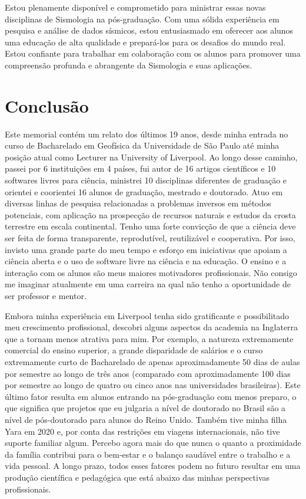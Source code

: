 \documentclass[10pt,a4paper,oneside]{book}
\begin{document}
Estou plenamente disponível e comprometido para ministrar essas novas disciplinas de Sismologia na pós-graduação. Com uma sólida experiência em pesquisa e análise de dados sísmicos, estou entusiasmado em oferecer aos alunos uma educação de alta qualidade e prepará-los para os desafios do mundo real. Estou confiante para trabalhar em colaboração com os alunos para promover uma compreensão profunda e abrangente da Sismologia e suas aplicações.


\chapter{Conclusão}
\label{cap_conclusao}

Este memorial contém um relato dos últimos 19 anos, desde minha entrada no
curso de Bacharelado em Geofísica da Universidade de São Paulo até minha
posição atual como Lecturer na University of Liverpool.
Ao longo desse caminho, passei por 6 instituições em 4 países, fui autor de 16
artigos científicos e 10 softwares livres para ciência, ministrei 10
disciplinas diferentes de graduação e orientei e coorientei 16 alunos de
graduação, mestrado e doutorado.
Atuo em diversas linhas de pesquisa relacionadas a problemas inversos em
métodos potenciais, com aplicação na prospecção de recursos naturais e estudos
da crosta terrestre em escala continental.
Tenho uma forte convicção de que a ciência deve ser feita de forma
transparente, reprodutível, reutilizável e cooperativa.
Por isso, invisto uma grande parte do meu tempo e esforço em iniciativas que
apoiam a ciência aberta e o uso de software livre na ciência e na educação.
O ensino e a interação com os alunos são meus maiores motivadores
profissionais.
Não consigo me imaginar atualmente em uma carreira na qual não tenho a
oportunidade de ser professor e mentor.

Embora minha experiência em Liverpool tenha sido gratificante e possibilitado
meu crescimento profissional, descobri alguns aspectos da academia na
Inglaterra que a tornam menos atrativa para mim.
Por exemplo, a natureza extremamente comercial do ensino superior, a grande
disparidade de salários e o curso extremamente curto de Bacharelado de apenas
aproximadamente 50 dias de aulas por semestre ao longo de três anos (comparado
com aproximadamente 100 dias por semestre ao longo de quatro ou cinco anos nas
universidades brasileiras).
Este último fator resulta em alunos entrando na pós-graduação com menos
preparo, o que significa que projetos que eu julgaria a nível de doutorado no
Brasil são a nível de pós-doutorado para alunos do Reino Unido.
Também tive minha filha Yara em 2020 e, por conta das restrições em viagens
internacionais, não tive suporte familiar algum.
Percebo agora mais do que nunca o quanto a proximidade da família contribui
para o bem-estar e o balanço saudável entre o trabalho e a vida pessoal.
A longo prazo, todos esses fatores podem no futuro resultar em uma produção
científica e pedagógica que está abaixo das minhas perspectivas profissionais.
\end{document}
